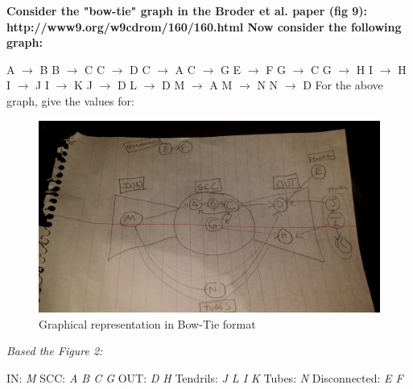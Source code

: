 \documentclass{article}
\begin{document}
{\bf Consider the "bow-tie" graph in the Broder et al. paper (fig 9):\newline
    http://www9.org/w9cdrom/160/160.html\newline
\newline
    Now consider the following graph:\newline
\newline

    A $\rightarrow$ B\newline
    B $\rightarrow$ C\newline
    C $\rightarrow$ D\newline
    C $\rightarrow$ A\newline
    C $\rightarrow$ G\newline
    E $\rightarrow$ F\newline
    G $\rightarrow$ C\newline
    G $\rightarrow$ H\newline
    I $\rightarrow$ H\newline
    I $\rightarrow$ J\newline
    I $\rightarrow$ K\newline
    J $\rightarrow$ D \newline
    L $\rightarrow$ D\newline
    M $\rightarrow$ A\newline
    M $\rightarrow$ N\newline
    N $\rightarrow$ D\newline
\newline    
    For the above graph, give the values for:
\newline
\newline


\begin{figure}[h!]
    \includegraphics[width=\textwidth]{prob3}
    \caption{Graphical representation in Bow-Tie format}
\end{figure}

{\it Based the Figure 2:}

    IN: {\it M}
    \newline
    SCC: {\it A B C G}
    \newline
    OUT: {\it D H}
    \newline
    Tendrils: {\it J L I K}
    \newline
    Tubes: {\it N}
    \newline
    Disconnected: {\it E F}
    \newline
} 
 
\end{document}
